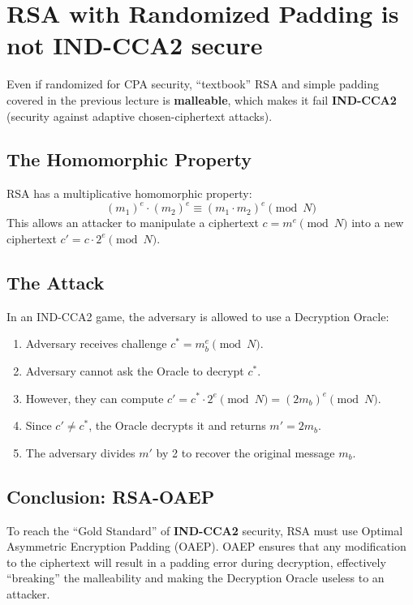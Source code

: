 \documentclass[
  letterpaper,
]{scrbook}
\providecommand{\tightlist}{%
  \setlength{\itemsep}{0pt}\setlength{\parskip}{0pt}}
\theoremstyle{definition}
\theoremstyle{plain}
\theoremstyle{plain}
\theoremstyle{remark}
\begin{document}
\section{RSA with Randomized Padding is not IND-CCA2
secure}\label{rsa-with-randomized-padding-is-not-ind-cca2-secure}

Even if randomized for CPA security, ``textbook'' RSA and simple padding
covered in the previous lecture is \textbf{malleable}, which makes it
fail \textbf{IND-CCA2} (security against adaptive chosen-ciphertext
attacks).

\subsection{The Homomorphic Property}\label{the-homomorphic-property}

RSA has a multiplicative homomorphic property:
\[ (m_1)^e \cdot (m_2)^e \equiv (m_1 \cdot m_2)^e \pmod N \] This allows
an attacker to manipulate a ciphertext \(c = m^e \pmod N\) into a new
ciphertext \(c' = c \cdot 2^e \pmod N\).

\subsection{The Attack}\label{the-attack}

In an IND-CCA2 game, the adversary is allowed to use a Decryption
Oracle:

\begin{enumerate}
\def\labelenumi{\arabic{enumi}.}
\tightlist
\item
  Adversary receives challenge \(c^* = m_b^e \pmod N\).
\item
  Adversary cannot ask the Oracle to decrypt \(c^*\).
\item
  However, they can compute
  \(c' = c^* \cdot 2^e \pmod N = (2m_b)^e \pmod N\).
\item
  Since \(c' \neq c^*\), the Oracle decrypts it and returns
  \(m' = 2m_b\).
\item
  The adversary divides \(m'\) by 2 to recover the original message
  \(m_b\).
\end{enumerate}

\subsection{Conclusion: RSA-OAEP}\label{conclusion-rsa-oaep}

To reach the ``Gold Standard'' of \textbf{IND-CCA2} security, RSA must
use Optimal Asymmetric Encryption Padding (OAEP). OAEP ensures that any
modification to the ciphertext will result in a padding error during
decryption, effectively ``breaking'' the malleability and making the
Decryption Oracle useless to an attacker.
\end{document}
